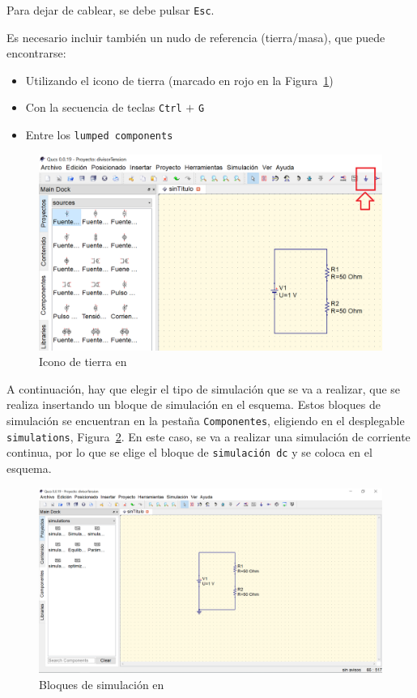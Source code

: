 \documentclass[a4paper,10pt]{article} %
\begin{document}
Para dejar de cablear, se debe pulsar \texttt{Esc}.

Es necesario incluir también un nudo de referencia (tierra/masa), que puede encontrarse:
\begin{itemize}
    \item Utilizando el icono de tierra (marcado en rojo en la Figura~\ref{fig.qucs6})
    \item Con la secuencia de teclas \texttt{Ctrl} $+$ \texttt{G}
    \item Entre los \texttt{lumped components}
\end{itemize}
    \begin{figure}[htbp]
        \centering
        \includegraphics[width=0.7\linewidth]{../figs/qucs6.png}
        \caption{Icono de tierra en \qucs}
        \label{fig.qucs6}
    \end{figure}

A continuación, hay que elegir el tipo de simulación que se va a realizar, que se realiza insertando un bloque de simulación en el esquema. Estos bloques de simulación se encuentran en la pestaña \texttt{Componentes}, eligiendo en el desplegable \texttt{simulations}, Figura~\ref{fig.qucs7}. En este caso, se va a realizar una simulación de corriente continua, por lo que se elige el bloque de \texttt{simulación dc} y se coloca en el esquema.  
\begin{figure}[htbp]
    \centering
    \includegraphics[width=\linewidth]{../figs/qucs7.PNG}
    \caption{Bloques de simulación en \qucs}
    \label{fig.qucs7}
\end{figure}
\end{document}
